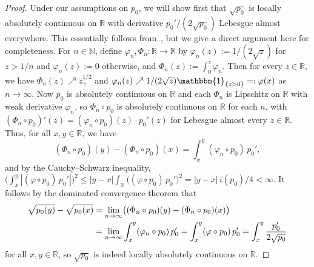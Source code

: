 \documentclass[a4paper]{article}
\newcommand{\N}{\mathbb{N}}
\newcommand{\R}{\mathbb{R}}
\newcommand{\Ind}{\mathbbm{1}}
\theoremstyle{definition}
\begin{document}
\begin{proof}
Under our assumptions on $p_0$, we will show first that $\sqrt{p_0}$ is locally absolutely continuous on $\R$ with derivative $p_0'/(2\sqrt{p_0})$ Lebesgue almost everywhere. This essentially follows from~\citet[Theorem~3 and Corollary~8]{serrin1969general}, but we give a direct argument here for completeness. For $n \in \N$, define $\varphi_n, \Phi_n \colon \R \to \R$ by $\varphi_n(z) := 1/(2\sqrt{z})$ for $z > 1/n$ and $\varphi_n(z) := 0$ otherwise, and $\Phi_n(z) := \int_0^z \varphi_n$. Then for every $z \in \R$, we have $\Phi_n(z) \nearrow z_+^{1/2}$ and $\varphi_n(z) \nearrow 1/(2\sqrt{z})\Ind_{\{z > 0\}} =: \varphi(x)$ as $n \to \infty$. Now $p_0$ is absolutely continuous on $\R$ and each $\Phi_n$ is Lipschitz on $\R$ with weak derivative $\varphi_n$, so $\Phi_n \circ p_0$ is absolutely continuous on $\R$ for each $n$, with $(\Phi_n \circ p_0)'(z) = (\varphi_n \circ p_0)(z) \cdot p_0'(z)$ for Lebesgue almost every $z \in \R$. Thus, for all $x,y \in \R$, we have 
\[
(\Phi_n \circ p_0)(y) - (\Phi_n \circ p_0)(x) = \int_x^y (\varphi_n \circ p_0)\,p_0', 
\]
and by the Cauchy--Schwarz inequality, $\bigl(\int_x^y |(\varphi \circ p_0)\,p_0'|\bigr)^2 \leq |y - x|\int_\R \bigl((\varphi \circ p_0)\,p_0'\bigr)^2 = |y - x|\,i(p_0)/4 < \infty$. It follows by the dominated convergence theorem that
\begin{align}
\sqrt{p_0(y)} - \sqrt{p_0(x)} &= \lim_{n \to \infty} \bigl((\Phi_n \circ p_0)(y) - (\Phi_n \circ p_0)(x)\bigr) \notag \\
\label{eq:sqrt-p0-ac}
&= \lim_{n \to \infty} \int_x^y (\varphi_n \circ p_0)\,p_0' = \int_x^y (\varphi \circ p_0)\,p_0' = \int_x^y \frac{p_0'}{2\sqrt{p_0}}
\end{align}
for all $x,y \in \R$, so $\sqrt{p_0}$ is indeed locally absolutely continuous on $\R$. 


\end{proof}
\end{document}
